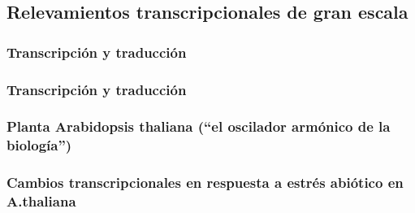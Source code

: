 \documentclass[serif,9pt, t]{beamer}
\begin{document}
\subsection{Relevamientos transcripcionales de gran escala}

\subsubsection*{Transcripción y traducción}
\begin{frame}
\frametitle{Transcripción y traducción}

\begin{figure}[t!]
  \centering
\end{figure}

\end{frame}

\subsubsection*{Planta Arabidopsis thaliana (``el oscilador armónico de la biología'')}
\begin{frame}
\frametitle{Cambios transcripcionales en respuesta a estrés abiótico en A.thaliana} 
\end{frame}
\end{document}
